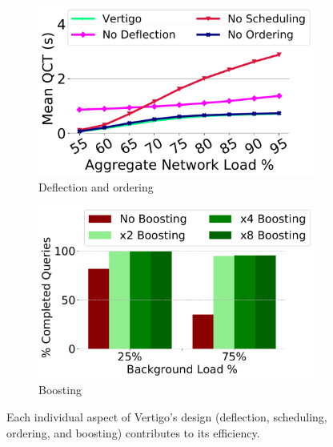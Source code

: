 \begin{figure}[t]
	\centering
		\begin{subfigure}[t]{.49\linewidth}
	\centering
	\includegraphics[width=0.98\linewidth]{figs/components50qct.pdf}
		\caption{\small{Deflection and ordering}}
		\label{fig:component}
	\end{subfigure}
		\begin{subfigure}[t]{.49\linewidth}
	\centering
	\includegraphics[width=0.98\linewidth]{figs/boosting.pdf}
		\caption{\small{Boosting}}
    	\label{fig:boost}
		
	\end{subfigure}
	\vspace{-2mm}
	\caption{\small{Each individual aspect of Vertigo's design (deflection, scheduling, ordering, and boosting) contributes to its efficiency.}}
	\label{fig:deflectionandboost}
	\vspace{-2mm}
\end{figure}

	
